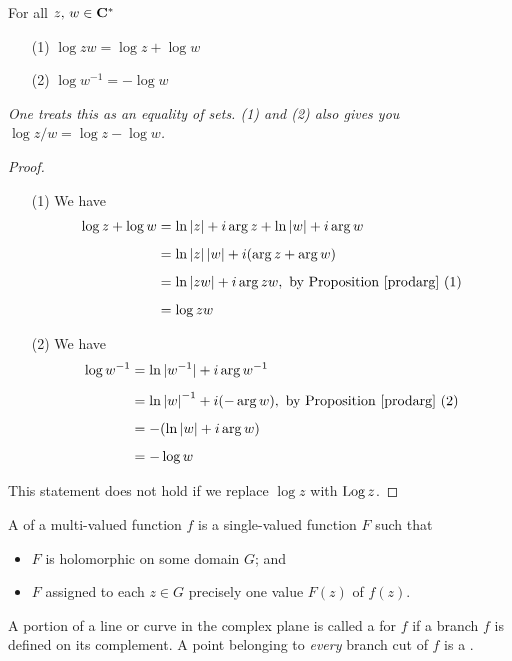 \begin{proposition}
For all $z,\, w\in \mathbf C^*$
\begin{multicols}{2}
\begin{itemize}
\item[(1)] $\log zw = \log z + \log w$
\item[(2)] $\log w^{-1} = -\log w$
\end{itemize}
\end{multicols}
\emph{One treats this as an equality of sets. (1) and (2) also gives you $\log z/w = \log z - \log w$.}
\end{proposition}
\begin{proof}\hfill
\begin{itemize}
\item[(1)] We have
\begin{align*}
\log z + \log w &= \ln\left\lvert z\right\rvert + i\arg z + \ln\left\lvert w\right\rvert + i\arg w\\[0.5em]
&= \ln\left\lvert z\right\rvert\left\lvert w\right\rvert + i(\arg z + \arg w)\\[0.5em]
&= \ln\left\lvert zw\right\rvert + i\arg zw,\ \text{by Proposition \ref{prodarg} (1)}\\[0.5em]
&= \log zw
\end{align*}
\item[(2)] We have
\begin{align*}
\log w^{-1} &= \ln|w^{-1}| + i\arg w^{-1}\\[0.5em]
&= \ln\left\lvert w\right\rvert^{-1} + i(-\arg w),\ \text{by Proposition \ref{prodarg} (2)}\\[0.5em]
&= -(\ln\left\lvert w\right\rvert + i\arg w)\\[0.5em]
&= -\log w
\end{align*}
\end{itemize}
This statement does not hold if we replace $\log z$ with $\operatorname{Log} z$.
\end{proof}

\medskip

\begin{definition}
A  of a multi-valued function $f$ is a single-valued function $F$ such that
\begin{itemize}
\item $F$ is holomorphic on some domain $G$; and
\item $F$ assigned to each $z\in G$ precisely one value $F(z)$ of $f(z)$.
\end{itemize}
A portion of a line or curve in the complex plane is called a  for $f$ if a branch $f$ is defined on its complement. A point belonging to \emph{every} branch cut of $f$ is a .
\end{definition}

